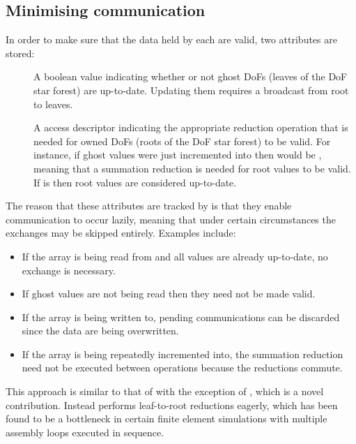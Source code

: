 \documentclass[thesis]{subfiles}
\begin{document}
\subsection{Minimising communication}
\label{sec:parallel_minimising_communication}

In order to make sure that the data held by each  are valid, two attributes are stored:
\begin{description}
  \item[]
    A boolean value indicating whether or not ghost DoFs (leaves of the DoF star forest) are up-to-date.
    Updating them requires a broadcast from root to leaves.

  \item[]
    A  access descriptor indicating the appropriate reduction operation that is needed for owned DoFs (roots of the DoF star forest) to be valid.
    For instance, if ghost values were just incremented into then  would be , meaning that a summation reduction is needed for root values to be valid.
    If  is  then root values are considered up-to-date.
\end{description}

The reason that these attributes are tracked by  is that they enable communication to occur lazily, meaning that under certain circumstances the exchanges may be skipped entirely.
Examples include:
\begin{itemize}
  \item If the array is being read from and all values are already up-to-date, no exchange is necessary.
  \item If ghost values are not being read then they need not be made valid.
  \item If the array is being written to, pending communications can be discarded since the data are being overwritten.
  \item If the array is being repeatedly incremented into, the summation reduction need not be executed between operations because the reductions commute.
\end{itemize}

This approach is similar to that of  with the exception of , which is a novel contribution.
Instead  performs leaf-to-root reductions eagerly, which has been found to be a bottleneck in certain finite element simulations with multiple assembly loops executed in sequence.
\end{document}
